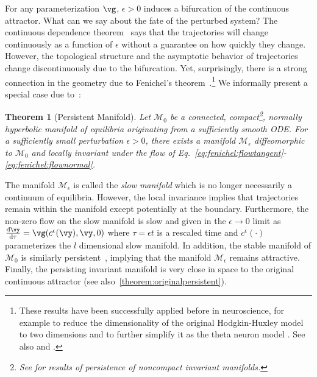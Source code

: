 \documentclass{article} %
\newcommand{\pscomment}[1]{\textcolor{BurntOrange}{(#1)}}
\newcounter{ct}
\newcommand{\dm}[1]{\ensuremath{\mathrm{d}{#1}}} %
\newcommand{\RN}[2]{\frac{\dm{#1}}{\dm{#2}}} %
\newcommand{\manifold}{\mathcal{M}}
\newtheorem{theorem}{Theorem}
\theoremstyle{definition}
\theoremstyle{remark}
\renewcommand{\cite}{\citep}
\begin{document}
For any parameterization \(\vg\), \(\epsilon > 0\) induces a bifurcation of the continuous attractor.
What can we say about the fate of the perturbed system?
The continuous dependence theorem~\citep{Chicone2006} says that the trajectories will change continuously as a function of \(\epsilon\) without a guarantee on how quickly they change.
However, the topological structure and the asymptotic behavior of trajectories change discontinuously due to the bifurcation.
Yet, surprisingly, there is a strong connection in the geometry due to Fenichel's theorem~\cite{fenichel1971}.\footnote{These results have been successfully applied before in neuroscience, for example to reduce the dimensionality of the original Hodgkin-Huxley model \citep{hodgkin1952quantitative} to two dimensions \citep{rinzel1985excitation} and to further simplify it as the theta neuron model \citep{ermentrout1986parabolic}. See also \citep{Kopell1996} and \citep{ermentrout2010}.}
We informally present a special case due to~\citet{Jones1995}:

\setlength\belowcaptionskip{2ex}

\begin{theorem}[Persistent Manifold]\label{theorem:persistent}
Let \(\manifold_{0}\) be a connected, compact\footnote{See \citep{eldering2013normally} for results of persistence of noncompact invariant manifolds.}, normally hyperbolic manifold of equilibria originating from a sufficiently smooth ODE.
For a sufficiently small perturbation \(\epsilon > 0\), there exists a manifold \(\manifold_{\epsilon}\) diffeomorphic to \(\manifold_{0}\) and locally invariant under the flow of Eq.~\eqref{eq:fenichel:flowtangent}-\eqref{eq:fenichel:flownormal}.
\end{theorem}

The manifold \(\manifold_{\epsilon}\) is called the \emph{slow manifold} which is no longer necessarily a continuum of equilibria.
However, the local invariance implies that trajectories remain within the manifold except potentially at the boundary.
Furthermore, the non-zero flow on the slow manifold is slow and given in the \(\epsilon \to 0\) limit as \(\RN{\vy}{\tau} = \vg(c^{\epsilon}(\vy), \vy, 0)\) where \(\tau = \epsilon t\) is a rescaled time and \(c^{\epsilon}(\cdot)\) parameterizes the \(l\) dimensional slow manifold.
In addition, the stable manifold of \(\manifold_{0}\) is similarly persistent~\cite{Jones1995}, implying that the manifold \(\manifold_{\epsilon}\) remains attractive.
Finally, the persisting invariant manifold is very close in space to the original continuous attractor (see also~\ref{theorem:originalpersistent}).
\end{document}
